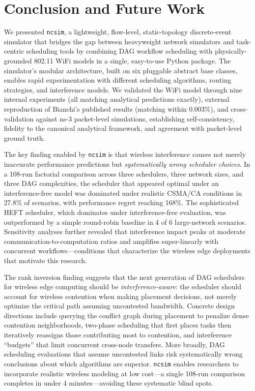 \documentclass[conference]{IEEEtran}
\newcommand{\ncsim}{\texttt{ncsim}}
\begin{document}
\section{Conclusion and Future Work}
\label{sec:conclusion}

We presented \ncsim{}, a lightweight, flow-level, static-topology
discrete-event simulator that bridges the gap between heavyweight network
simulators and task-centric scheduling tools by combining DAG workflow
scheduling with physically-grounded 802.11 WiFi models in a single,
easy-to-use Python package.  The simulator's
modular architecture, built on six pluggable abstract base classes, enables
rapid experimentation with different scheduling algorithms, routing
strategies, and interference models.  We validated the WiFi model through
nine internal experiments (all matching analytical predictions exactly),
external reproduction of Bianchi's published results (matching within
0.003\%), and cross-validation against ns-3 packet-level simulations,
establishing self-consistency, fidelity to the canonical analytical
framework, and agreement with packet-level ground truth.

The key finding enabled by \ncsim{} is that wireless interference causes
not merely inaccurate performance predictions but \emph{systematically wrong
scheduler choices}.  In a 108-run factorial comparison across three
schedulers, three network sizes, and three DAG complexities, the scheduler
that appeared optimal under an interference-free model was dominated under
realistic CSMA/CA conditions in 27.8\% of scenarios, with performance
regret reaching 168\%.  The sophisticated HEFT scheduler, which dominates
under interference-free evaluation, was outperformed by a simple round-robin
baseline in 4 of 6 large-network scenarios.  Sensitivity analyses further
revealed that interference impact peaks at moderate
communication-to-computation ratios and amplifies super-linearly with
concurrent workflows---conditions that characterize the wireless edge
deployments that motivate this research.

The rank inversion finding suggests that the next generation of DAG
schedulers for wireless edge computing should be \emph{interference-aware}:
the scheduler should account for wireless contention when making placement
decisions, not merely optimize the critical path assuming uncontested
bandwidth.  Concrete design directions include querying the conflict graph
during placement to penalize dense contention neighborhoods, two-phase
scheduling that first places tasks then iteratively reassigns those
contributing most to contention, and interference ``budgets'' that limit
concurrent cross-node transfers.  More broadly, DAG scheduling evaluations
that assume uncontested links risk systematically wrong conclusions about
which algorithms are superior.  \ncsim{} enables researchers to
incorporate realistic wireless modeling at low cost---a single 108-run
comparison completes in under 4 minutes---avoiding these systematic blind
spots.
\end{document}
